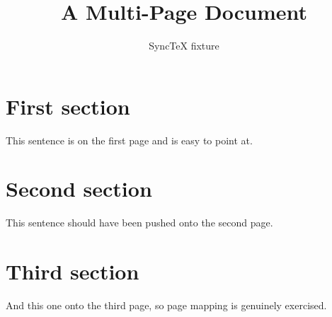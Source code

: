 \documentclass{article}
\title{A Multi-Page Document}
\author{SyncTeX fixture}
\begin{document}
\maketitle

\section{First section}
This sentence is on the first page and is easy to point at.

\lipsum[1-6]

\section{Second section}
This sentence should have been pushed onto the second page.

\lipsum[7-12]

\section{Third section}
And this one onto the third page, so page mapping is genuinely exercised.

\lipsum[13-15]
\end{document}
